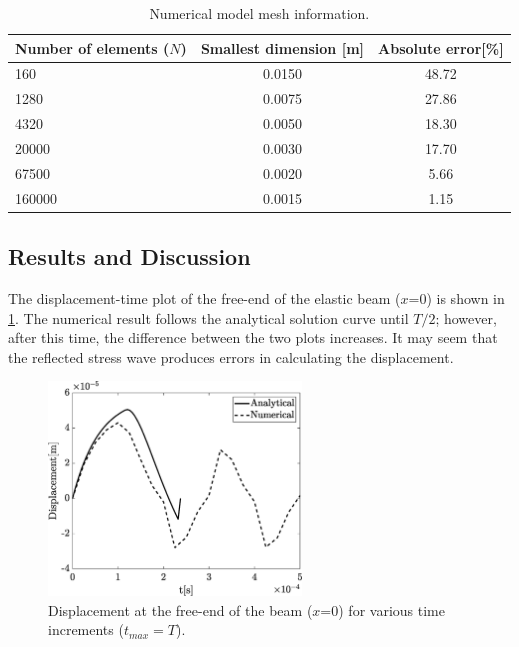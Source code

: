 \documentclass{article}
\begin{document}
\begin{table}[H]
    \centering
    \caption{Numerical model mesh information.}
    \begin{tabular}{l c c} \hline
        Number of elements ($N$) & Smallest dimension [m] & Absolute error[\%] \\ \hline
        160 & 0.0150 & 48.72 \\
        1280 & 0.0075 & 27.86 \\
        4320 & 0.0050 & 18.30 \\
        20000 & 0.0030 & 17.70 \\
        67500 & 0.0020 & 5.66 \\
        160000 & 0.0015 & 1.15 \\ \hline
    \end{tabular} 
    \label{tab:mesh_convergence}
\end{table}

\subsection{Results and Discussion}
The displacement-time plot of the free-end of the elastic beam ($x$=0) is shown in \cref{fig:displ}. The numerical result follows the analytical solution curve until $T/2$; however, after this time, the difference between the two plots increases. It may seem that the reflected stress wave produces errors in calculating the displacement. \\

\begin{figure}[ht]
    \centering
    \includegraphics[width = 0.6\textwidth ]{figures/displacement.eps}
    \caption{Displacement at the free-end of the beam ($x$=0) for various time increments ($t_{max}=T$).}
    \label{fig:displ}
\end{figure}
\end{document}

